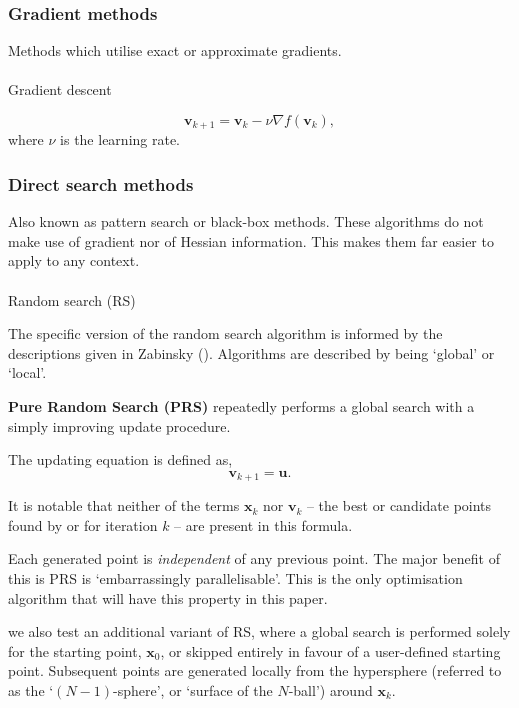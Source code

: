 \documentclass[
  a4paper,
]{article}
\makeatletter
\let\oldparagraph\paragraph
\renewcommand{\paragraph}{
    \@ifstar
      \xxxParagraphStar
      \xxxParagraphNoStar
  }
\newcommand{\xxxParagraphStar}[1]{\oldparagraph*{#1}\mbox{}}
\newcommand{\xxxParagraphNoStar}[1]{\oldparagraph{#1}\mbox{}}
\newcommand{\B}[1]{\boldsymbol{#1}}
\newcommand{\+}{\phantom{-}}
\makeatother
\begin{document}
\subsubsection{Gradient methods}\label{gradient-methods}

Methods which utilise exact or approximate gradients.

\paragraph{Gradient descent}\label{gradient-descent}

\[\B v_{k+1} = \B v_k -\nu \nabla f\left( \B v_k \right),\] where
\(\nu\) is the learning rate.

\subsubsection{Direct search methods}\label{direct-search-methods}

Also known as pattern search or black-box methods. These algorithms do
not make use of gradient nor of Hessian information. This makes them far
easier to apply to any context.

\paragraph{Random search (RS)}\label{random-search-rs}

The specific version of the random search algorithm is informed by the
descriptions given in Zabinsky ().
Algorithms are described by being `global' or `local'.

\textbf{Pure Random Search (PRS)} repeatedly performs a global search
with a simply improving update procedure.

The updating equation is defined as, \[\B v_{k+1} = \B u.\]

It is notable that neither of the terms \(\B x_k\) nor \(\B v_k\) -- the
best or candidate points found by or for iteration \(k\) -- are present
in this formula.

Each generated point is \emph{independent} of any previous point. The
major benefit of this is PRS is `embarrassingly parallelisable'. This is
the only optimisation algorithm that will have this property in this
paper.

we also test an additional variant of RS, where a global search is
performed solely for the starting point, \(\B x_0\), or skipped entirely
in favour of a user-defined starting point. Subsequent points are
generated locally from the hypersphere (referred to as the
`\(\left(N-1\right)\)-sphere', or `surface of the \(N\)-ball') around
\(\B x_k\).
\end{document}
